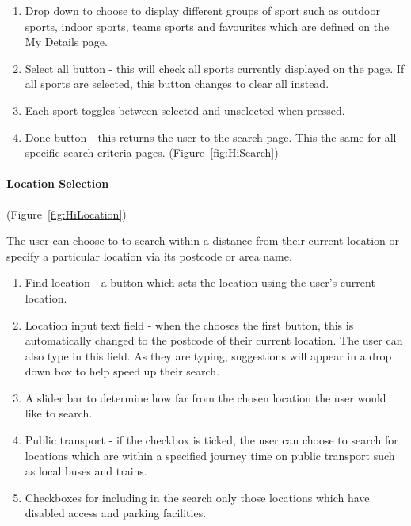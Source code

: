 \begin{enumerate}
	\item Drop down to choose to display different groups of sport such as outdoor
	      sports, indoor sports, teams sports and favourites which are defined
	      on the My Details page.
	\item Select all button - this will check all sports currently displayed
	      on the page. If all sports are selected, this button changes to clear
	      all instead.
	\item Each sport toggles between selected and unselected when pressed.
	\item Done button - this returns the user to the search page. This the same
	      for all specific search criteria pages. (Figure~\ref{fig:HiSearch})
\end{enumerate}

\paragraph{Location Selection}

(Figure~\ref{fig:HiLocation})


The user can choose to to search within a distance from their current
location or specify a particular location via its postcode or area
name.
\begin{enumerate}
	\item Find location - a button which sets the location using the user's
	      current location.
	\item Location input text field - when the chooses the first button, this
	      is automatically changed to the postcode of their current location.
	      The user can also type in this field. As they are typing, suggestions
	      will appear in a drop down box to help speed up their search.
	\item A slider bar to determine how far from the chosen location the user
	      would like to search. 
	\item Public transport - if the checkbox is ticked, the user can choose
	      to search for locations which are within a specified journey time
	      on public transport such as local buses and trains.
	\item Checkboxes for including in the search only those locations which
	      have disabled access and parking facilities.
\end{enumerate}

